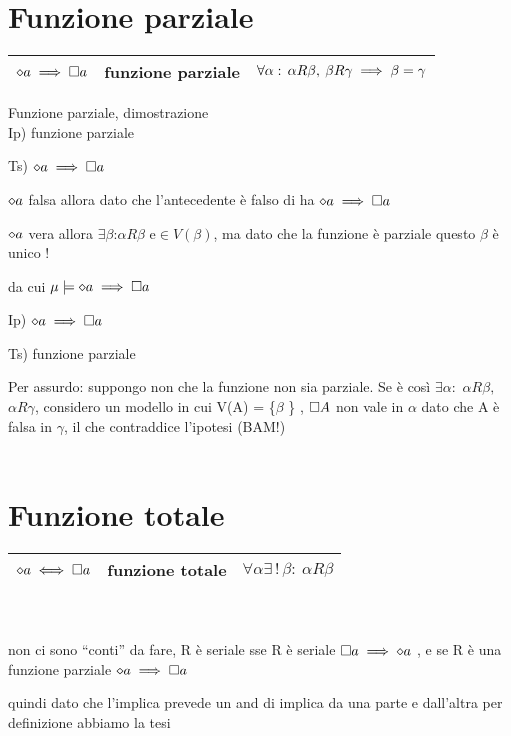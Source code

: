 \section{Funzione parziale}

\begin{tabular}{|c|c|c|}
\hline 
$\diamond a\implies\square a$  & funzione parziale  & $\forall\alpha:\,\alpha R\beta,\:\beta R\gamma\implies\beta=\gamma$\tabularnewline
\hline 
\end{tabular}

Funzione parziale, dimostrazione\\


Ip) funzione parziale

Ts) $\diamond a\implies\square a$ 

$\diamond a$ falsa allora dato che l'antecedente è falso di ha $\diamond a\implies\square a$

$\diamond a$ vera allora $\exists\beta$:$\alpha R\beta$ e$\in V(\beta)$,
ma dato che la funzione è parziale questo $\beta$ è unico !

da cui $\mu\models\diamond a\implies\square a$

Ip) $\diamond a\implies\square a$ 

Ts) funzione parziale

Per assurdo: suppongo non che la funzione non sia parziale. Se è così
$\exists\alpha:$ $\alpha R\beta,$ $\alpha R\gamma$, considero un
modello in cui V(A) = \{$\beta$ \} , $\square A$ non vale in $\alpha$
dato che A è falsa in $\gamma$, il che contraddice l'ipotesi (BAM!)\\
 \\
 


\section{Funzione totale}

\begin{tabular}{|c|c|c|}
\hline 
$\diamond a\iff\square a$  & funzione totale  & $\forall\alpha\exists\,!\,\beta:\:\alpha R\beta$ \tabularnewline
\hline 
\end{tabular}\\
 \\


non ci sono ``conti'' da fare, R è seriale sse R è seriale $\square a\implies\diamond a$
, e se R è una funzione parziale $\diamond a\implies\square a$

quindi dato che l'implica prevede un and di implica da una parte e
dall'altra per definizione abbiamo la tesi

